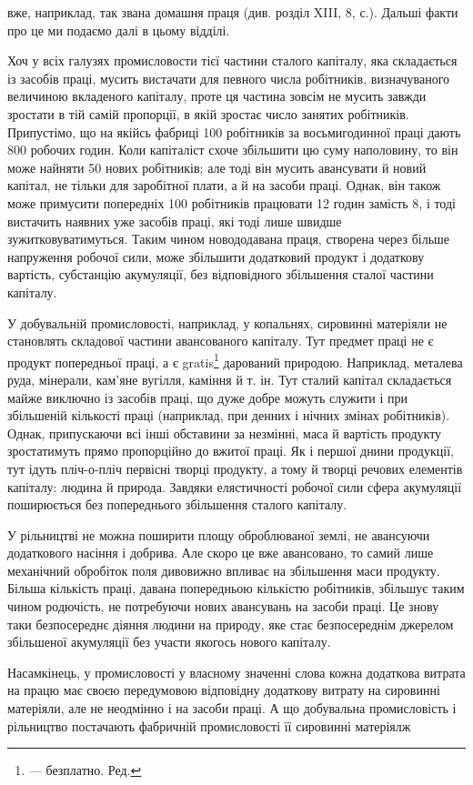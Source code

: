 вже, наприклад, так звана домашня праця (див. розділ XIII,
8, с.). Дальші факти про це ми подаємо далі в цьому відділі.

Хоч у всіх галузях промисловости тієї частини сталого капіталу,
яка складається із засобів праці, мусить вистачати для
певного числа робітників, визначуваного величиною вкладеного
капіталу, проте ця частина зовсім не мусить завжди зростати в
тій самій пропорції, в якій зростає число занятих робітників.
Припустімо, що на якійсь фабриці 100 робітників за восьмигодинної
праці дають 800 робочих годин. Коли капіталіст схоче
збільшити цю суму наполовину, то він може найняти 50 нових
робітників; але тоді він мусить авансувати й новий капітал,
не тільки для заробітної плати, а й на засоби праці. Однак, він
також може примусити попередніх 100 робітників працювати
12 годин замість 8, і тоді вистачить наявних уже засобів праці,
які тоді лише швидше зужитковуватимуться. Таким чином новододавана
праця, створена через більше напруження робочої сили,
може збільшити додатковий продукт і додаткову вартість, субстанцію
акумуляції, без відповідного збільшення сталої частини
капіталу.

У добувальній промисловості, наприклад, у копальнях, сировинні
матеріяли не становлять складової частини авансованого
капіталу. Тут предмет праці не є продукт попередньої праці, а
є gratis\footnote*{
— безплатно. Ред.
} дарований природою. Наприклад, металева руда, мінерали,
кам’яне вугілля, каміння й т. ін. Тут сталий капітал складається
майже виключно із засобів праці, що дуже добре можуть
служити і при збільшеній кількості праці (наприклад, при денних
і нічних змінах робітників). Однак, припускаючи всі інші
обставини за незмінні, маса й вартість продукту зростатимуть
прямо пропорційно до вжитої праці. Як і першої днини продукції,
тут ідуть пліч-о-пліч первісні творці продукту, а тому й творці
речових елементів капіталу: людина й природа. Завдяки елястичності
робочої сили сфера акумуляції поширюється без попереднього
збільшення сталого капіталу.

У рільництві не можна поширити площу оброблюваної землі,
не авансуючи додаткового насіння і добрива. Але скоро це вже
авансовано, то самий лише механічний обробіток поля дивовижно
впливає на збільшення маси продукту. Більша кількість
праці, давана попередньою кількістю робітників, збільшує таким
чином родючість, не потребуючи нових авансувань на засоби
праці. Це знову таки безпосереднє діяння людини на природу,
яке стає безпосереднім джерелом збільшеної акумуляції без
участи якогось нового капіталу.

Насамкінець, у промисловості у власному значенні слова
кожна додаткова витрата на працю має своєю передумовою відповідну
додаткову витрату на сировинні матеріяли, але не неодмінно
і на засоби праці. А що добувальна промисловість і рільництво
постачають фабричній промисловості її сировинні матеріялж